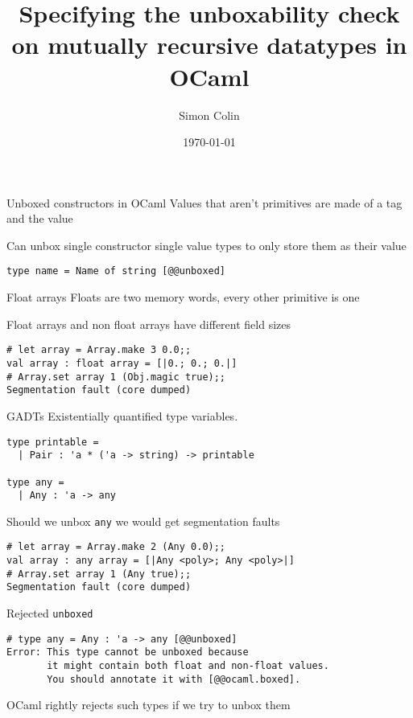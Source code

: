 \documentclass[svgnames,colorlinks]{beamer}
\title{Specifying the unboxability check on mutually recursive datatypes in OCaml}
\author{Simon Colin}
\date{\today}
\begin{document}
\begin{frame}
  \titlepage
\end{frame}

\begin{frame}[fragile]{Unboxed constructors in OCaml}
Values that aren't primitives are made of a tag and the value
	
\vfill
	
Can unbox single constructor single value types to only store them as their value

\vfill
  
\begin{lstlisting}
type name = Name of string [@@unboxed]
\end{lstlisting}
\end{frame}

\begin{frame}[fragile]{Float arrays}
Floats are two memory words, every other primitive is one
	
\vfill
	
Float arrays and non float arrays have different field sizes

\vfill

\begin{lstlisting}
# let array = Array.make 3 0.0;;
val array : float array = [|0.; 0.; 0.|]
# Array.set array 1 (Obj.magic true);;
Segmentation fault (core dumped)
\end{lstlisting}
\end{frame}

\begin{frame}[fragile]{GADTs}
Existentially quantified type variables.

\vfill

\begin{lstlisting}
type printable =
  | Pair : 'a * ('a -> string) -> printable

type any =
  | Any : 'a -> any
\end{lstlisting}

\vfill

Should we unbox \texttt{any} we would get segmentation faults

\begin{lstlisting}
# let array = Array.make 2 (Any 0.0);;
val array : any array = [|Any <poly>; Any <poly>|]
# Array.set array 1 (Any true);;
Segmentation fault (core dumped)
\end{lstlisting}
\end{frame}

\begin{frame}[fragile]{Rejected \texttt{unboxed}}
\begin{lstlisting}
# type any = Any : 'a -> any [@@unboxed]
Error: This type cannot be unboxed because
       it might contain both float and non-float values.
       You should annotate it with [@@ocaml.boxed].
\end{lstlisting}
	\vfill

	OCaml rightly rejects such types if we try to unbox them
\end{frame}
\end{document}
